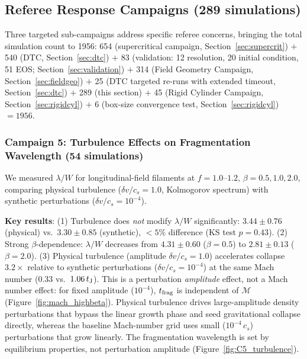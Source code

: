 \documentclass[twoside,twocolumn]{mnras}
\begin{document}
\subsection{Referee Response Campaigns (289 simulations)}
\label{sec:referee_response}

Three targeted sub-campaigns address specific referee concerns, bringing the total
simulation count to 1956: 654 (supercritical campaign, Section~\ref{sec:supercrit})
$+$ 540 (DTC, Section~\ref{sec:dtc}) $+$ 83 (validation: 12 resolution, 20 initial
condition, 51 EOS; Section~\ref{sec:validation}) $+$ 314 (Field Geometry Campaign,
Section~\ref{sec:fieldgeo}) $+$ 25 (DTC targeted re-runs with extended timeout,
Section~\ref{sec:dtc}) $+$ 289 (this section) $+$ 45 (Rigid Cylinder Campaign,
Section~\ref{sec:rigidcyl}) $+$ 6 (box-size convergence test, Section~\ref{sec:rigidcyl})
$= 1956$.

\subsubsection{Campaign 5: Turbulence Effects on Fragmentation Wavelength (54 simulations)}

We measured $\lambda/W$ for longitudinal-field filaments at $f = 1.0$--$1.2$,
$\beta = 0.5, 1.0, 2.0$, comparing physical turbulence ($\delta v/c_s = 1.0$,
Kolmogorov spectrum) with synthetic perturbations ($\delta v/c_s = 10^{-4}$).

\textbf{Key results}: (1) Turbulence does \textit{not} modify $\lambda/W$ significantly:
$3.44 \pm 0.76$ (physical) vs.\ $3.30 \pm 0.85$ (synthetic), $<5\%$ difference
(KS test $p = 0.43$). (2) Strong $\beta$-dependence: $\lambda/W$ decreases from
$4.31 \pm 0.60$ ($\beta = 0.5$) to $2.81 \pm 0.13$ ($\beta = 2.0$). (3) Physical turbulence (amplitude $\delta v/c_s = 1.0$) accelerates collapse $3.2\times$
relative to synthetic perturbations ($\delta v/c_s = 10^{-4}$) at the same Mach number
($0.33$ vs.\ $1.06\,t_{\rm J}$). This is a perturbation \textit{amplitude} effect, not
a Mach number effect: for fixed amplitude ($10^{-4}$), $t_{\rm frag}$ is independent
of $\mathcal{M}$ (Figure~\ref{fig:mach_highbeta}). Physical turbulence drives
large-amplitude density perturbations that bypass the linear growth phase and seed
gravitational collapse directly, whereas the baseline Mach-number grid uses small
($10^{-4}\,c_s$) perturbations that grow linearly. The fragmentation wavelength
is set by equilibrium properties, not perturbation amplitude (Figure~\ref{fig:C5_turbulence}).
\end{document}
